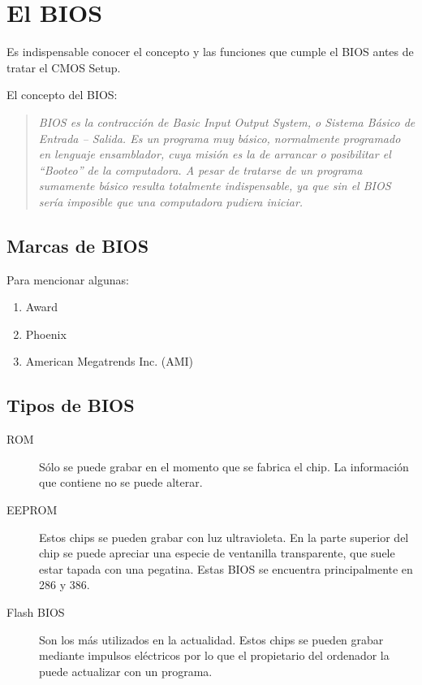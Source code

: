 \section{El BIOS}{\label{sec:bios}}

	Es indispensable conocer el concepto y las funciones que cumple el BIOS antes de tratar el CMOS Setup.

	El concepto del BIOS:
	\begin{quotation}

		{\em BIOS es la contracción de Basic Input Output System, o Sistema Básico de
		Entrada – Salida. 
		Es un programa muy básico, normalmente programado en lenguaje ensamblador,
		cuya misión es la de arrancar o posibilitar el “Booteo” de la computadora.
		A pesar de tratarse de un programa sumamente básico resulta totalmente
		indispensable, ya que sin el BIOS sería imposible que una computadora pudiera
		iniciar.}

	\end{quotation}
			
	\subsection{Marcas de BIOS}\label{sub:marcas de bios}
		Para mencionar algunas:
		\begin{enumerate}
			\item Award
			\item Phoenix
			\item American Megatrends Inc. (AMI)
		\end{enumerate}
	
	\subsection{Tipos de BIOS}\label{sub:chips bios}
		
		\begin{description}
			\item[ROM] Sólo se puede grabar en el momento que se fabrica el
				chip. La información que contiene no se puede alterar.
			\item[EEPROM] Estos chips se pueden grabar con luz ultravioleta. En
				la parte superior del chip se puede apreciar una especie de
				ventanilla transparente, que suele estar tapada con una
				pegatina. Estas BIOS se encuentra principalmente en 286 y 386.
				\cite{EEPROM}
			\item[Flash BIOS] Son los más utilizados en la actualidad. Estos
				chips se pueden grabar mediante impulsos eléctricos por lo que
				el propietario del ordenador la puede actualizar con un
				programa.
		\end{description}

